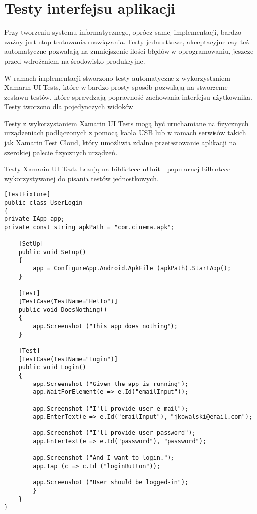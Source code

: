 \section{Testy interfejsu aplikacji}
Przy tworzeniu systemu informatycznego, oprócz samej implementacji, bardzo ważny jest etap testowania rozwiązania. Testy jednostkowe, akceptacyjne czy też automatyczne pozwalają na zmniejszenie ilości błędów w oprogramowaniu, jeszcze przed wdrożeniem na środowisko produkcyjne.

W ramach implementacji stworzono testy automatyczne z wykorzystaniem Xamarin UI Tests, które w bardzo prosty sposób pozwalają na stworzenie zestawu testów, które sprawdzają poprawność zachowania interfejsu użytkownika. Testy tworzono dla pojedynczych widoków

Testy z wykorzystaniem Xamarin UI Tests mogą być uruchamiane na fizycznych urządzeniach podłączonych z pomocą kabla USB lub w ramach serwisów takich jak Xamarin Test Cloud, który umożliwia zdalne przetestowanie aplikacji na szerokiej palecie fizycznych urządzeń.

Testy Xamarin UI Tests bazują na bibliotece nUnit - popularnej bilbiotece wykorzystywanej do pisania testów jednostkowych.

\begin{lstlisting}[caption={Przykładowy test automatyczny z wykorzystaniem Xamarin UI Tests},captionpos=b]
[TestFixture]
public class UserLogin
{
private IApp app;
private const string apkPath = "com.cinema.apk";

	[SetUp]
	public void Setup()
	{
		app = ConfigureApp.Android.ApkFile (apkPath).StartApp();
	}

	[Test]
	[TestCase(TestName="Hello")]
	public void DoesNothing()
	{
		app.Screenshot ("This app does nothing");
	}
			
	[Test]
	[TestCase(TestName="Login")]
	public void Login()
	{
		app.Screenshot ("Given the app is running");
		app.WaitForElement(e => e.Id("emailInput"));

		app.Screenshot ("I'll provide user e-mail");
		app.EnterText(e => e.Id("emailInput"), "jkowalski@email.com");
		
		app.Screenshot ("I'll provide user password");
		app.EnterText(e => e.Id("password"), "password");

		app.Screenshot ("And I want to login.");
		app.Tap (c => c.Id ("loginButton"));
		
		app.Screenshot ("User should be logged-in");
		}
	}
}
\end{lstlisting}
